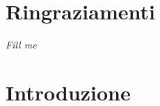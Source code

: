 \chapter*{Ringraziamenti} %
\begin{flushright}
\itshape 
Fill me
\end{flushright}


\chapter{Introduzione}
